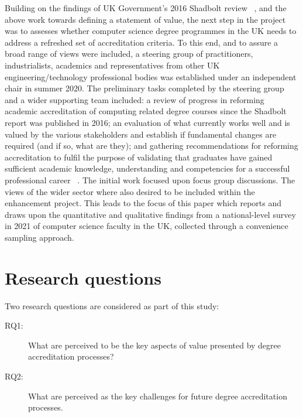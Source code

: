 \documentclass[conference]{IEEEtran}
\begin{document}
Building on the findings of UK Government’s 2016 Shadbolt review ~\cite{shadbolt2016shadbolt}, and the above work towards defining a statement of value, the next step in the project was to assesses whether computer science degree programmes in the UK needs to address a
refreshed set of accreditation criteria. To this end, and to assure a broad range of views were included, a steering group of practitioners, industrialists, academics and representatives from other UK engineering/technology professional bodies was established under an independent chair in summer 2020. The preliminary tasks completed by the steering group and a wider supporting team included: a review of progress in reforming academic accreditation of computing related degree courses since the Shadbolt report was published in 2016; an evaluation of what currently works well and is valued by the various stakeholders and establish if fundamental changes are required (and if so, what are they); and gathering recommendations for reforming accreditation to fulfil the purpose of validating that graduates have gained sufficient academic knowledge, understanding and competencies for a successful professional career ~\cite{irons-et-alposter:sigcse2021}. The initial work focused upon focus group discussions. The views of the wider sector where also desired to be included within the enhancement project. This leads to the focus of this paper which reports and draws upon the quantitative and qualitative findings from a national-level survey in 2021 of computer science faculty in the UK, collected through a convenience
sampling approach.

\section{Research questions}

Two research questions are considered as part of this study:\\

\begin{description}
	
	\item [RQ1:] What are perceived to be the key aspects of value presented by
	degree accreditation processes?\\
	
	\item [RQ2: ]What are perceived as the key challenges for future degree accreditation processes.\\
	
\end{description}
\end{document}
